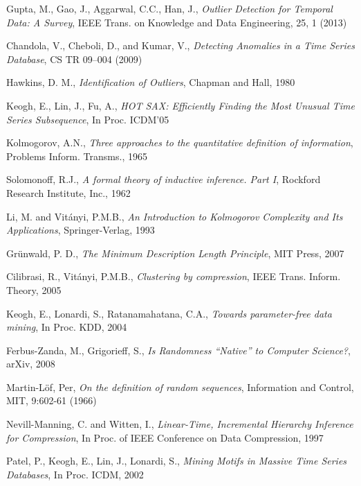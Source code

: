 \begin{thebibliography}{99}

Gupta, M., Gao, J., Aggarwal, C.C., Han, J.,
{\em Outlier Detection for Temporal Data: A Survey},
IEEE Trans. on Knowledge and Data Engineering, 25, 1 (2013)

Chandola, V., Cheboli, D., and Kumar, V.,
{\em Detecting Anomalies in a Time Series Database},
CS TR 09--004 (2009)

Hawkins, D. M.,
{\em Identification of Outliers},
Chapman and Hall, 1980

Keogh, E., Lin, J., Fu, A.,
{\em HOT SAX: Efficiently Finding the Most Unusual Time Series Subsequence},
In Proc. ICDM'05

Kolmogorov, A.N.,
{\em Three approaches to the quantitative definition of information},
Problems Inform. Transms., 1965

Solomonoff, R.J.,
{\em A formal theory of inductive inference. Part I},
Rockford Research Institute, Inc., 1962

Li, M. and Vit{\'a}nyi, P.M.B.,
{\em An Introduction to Kolmogorov Complexity and Its Applications},
Springer-Verlag, 1993

Gr{\"u}nwald, P. D.,
{\em The Minimum Description Length Principle},
MIT Press, 2007

Cilibrasi, R., Vit{\'a}nyi, P.M.B.,
{\em Clustering by compression}, 
IEEE Trans. Inform. Theory, 2005

Keogh, E., Lonardi, S., Ratanamahatana, C.A.,
{\em Towards parameter-free data mining},
In Proc. KDD, 2004

Ferbus-Zanda, M., Grigorieff, S.,
{\em Is Randomness ``Native'' to Computer Science?},
arXiv, 2008

Martin-L\"{o}f, Per,
{\em On the definition of random sequences},
Information and Control, MIT, 9:602-61 (1966)

Nevill-Manning, C. and Witten, I.,
{\em Linear-Time, Incremental Hierarchy Inference for Compression},
In Proc. of IEEE Conference on Data Compression, 1997

Patel, P., Keogh, E., Lin, J., Lonardi, S.,
{\em Mining Motifs in Massive Time Series Databases},
In Proc. ICDM, 2002


\end{thebibliography}

